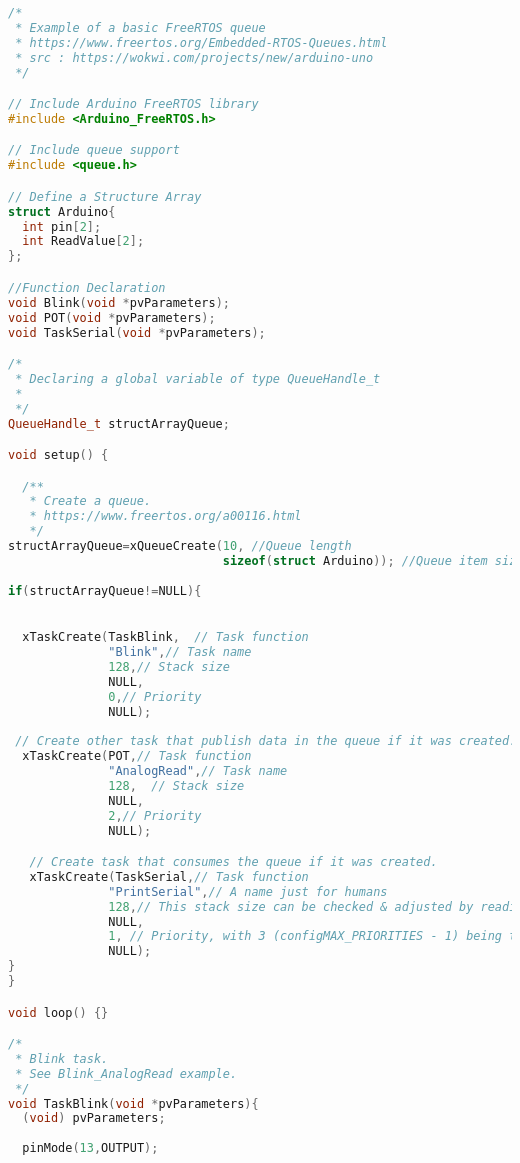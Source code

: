 \documentclass{article}
\begin{document}
\begin{lstlisting}[language=C++,basicstyle=\ttfamily\footnotesize,keywordstyle=\color{blue},commentstyle=\color{gray},stringstyle=\color{red}]
/*
 * Example of a basic FreeRTOS queue
 * https://www.freertos.org/Embedded-RTOS-Queues.html
 * src : https://wokwi.com/projects/new/arduino-uno
 */

// Include Arduino FreeRTOS library
#include <Arduino_FreeRTOS.h>

// Include queue support
#include <queue.h>

// Define a Structure Array
struct Arduino{
  int pin[2];
  int ReadValue[2];
};

//Function Declaration
void Blink(void *pvParameters);
void POT(void *pvParameters);
void TaskSerial(void *pvParameters);

/* 
 * Declaring a global variable of type QueueHandle_t 
 * 
 */
QueueHandle_t structArrayQueue;

void setup() {

  /**
   * Create a queue.
   * https://www.freertos.org/a00116.html
   */
structArrayQueue=xQueueCreate(10, //Queue length
                              sizeof(struct Arduino)); //Queue item size
                              
if(structArrayQueue!=NULL){

  
  xTaskCreate(TaskBlink,  // Task function
              "Blink",// Task name
              128,// Stack size 
              NULL,
              0,// Priority
              NULL);
 
 // Create other task that publish data in the queue if it was created.
  xTaskCreate(POT,// Task function
              "AnalogRead",// Task name
              128,  // Stack size
              NULL,
              2,// Priority
              NULL);

   // Create task that consumes the queue if it was created.
   xTaskCreate(TaskSerial,// Task function
              "PrintSerial",// A name just for humans
              128,// This stack size can be checked & adjusted by reading the Stack Highwater
              NULL,
              1, // Priority, with 3 (configMAX_PRIORITIES - 1) being the highest, and 0 being the lowest.
              NULL);
}
}

void loop() {}

/* 
 * Blink task. 
 * See Blink_AnalogRead example. 
 */
void TaskBlink(void *pvParameters){
  (void) pvParameters;
  
  pinMode(13,OUTPUT);
  

\end{lstlisting}
\end{document}
